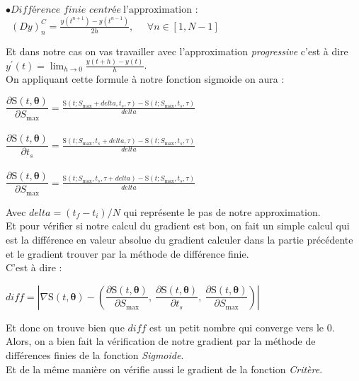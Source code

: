 \documentclass{article}
\begin{document}
$\bullet \textit{Différence finie centrée}~\text{l'approximation}$ :\\
\
  $(Dy)_{n}^{C}=\frac{y(t^{n+1})-y(t^{n-1})}{2h}, ~~~~~~ \forall n \in [1,N-1]$

Et dans notre cas on vas travailler avec l'approximation \textit{progressive} c'est à dire $y^{'}(t)=\lim_{h\rightarrow 0} \frac{y(t+h)-y(t)}{h}$.\\
 On appliquant cette formule à notre fonction sigmoide on aura : \\

\begin{center}
$\dfrac{\partial \text{S}(t,\boldsymbol{\theta })}{ \partial S_{\text{max}}}=\frac{\text{S}(t;S_{\max}+delta,t_{s},\tau)-\text{S}(t;S_{\max},t_{s},\tau)}{delta}$\\
$~$\\
$\dfrac{\partial \text{S}(t,\boldsymbol{\theta })}{ \partial t_{s}}=\frac{\text{S}(t;S_{\max},t_{s}+delta,\tau)-\text{S}(t;S_{\max},t_{s},\tau)}{delta}$\\
$~$\\
$\dfrac{\partial \text{S}(t,\boldsymbol{\theta })}{ \partial S_{\text{max}}}=\frac{\text{S}(t;S_{\max},t_{s},\tau+delta)-\text{S}(t;S_{\max},t_{s},\tau)}{delta}$\\
\end{center}

Avec $delta=(t_{f}-t_{i})/N$ qui représente le pas de notre approximation.\\
Et pour vérifier si notre calcul du gradient est bon, on fait un simple calcul qui est la différence en valeur absolue du gradient calculer dans la partie précédente et le gradient trouver par la méthode de différence finie.\\
C'est à dire :\\
\begin{center}
  $diff=|{\nabla} \text{S}(t,\boldsymbol{\theta })-(\dfrac{\partial \text{S}(t,\boldsymbol{\theta })}{ \partial S_{\text{max}}},~\dfrac{\partial \text{S}(t,\boldsymbol{\theta })}{ \partial t_{s}},~\dfrac{\partial \text{S}(t,\boldsymbol{\theta })}{ \partial S_{\text{max}}})|$
\end{center}
Et donc on trouve bien que $diff$ est un petit nombre qui converge vers le $0$.\\ 
Alors, on a bien fait la vérification de notre gradient par la méthode de différences finies de la fonction \textit{Sigmoide}.\\
Et de la m\^{e}me manière on vérifie aussi le gradient de la fonction \textit{Critère}.\\
\end{document}
